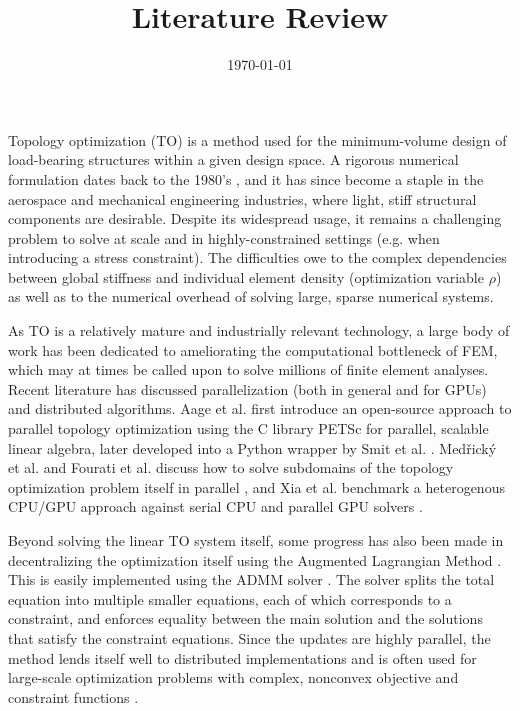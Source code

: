 \documentclass[12pt]{article}
\title{Literature Review}
\author{}
\date{\today}
\begin{document}
\maketitle

Topology optimization (TO) is a method used for the minimum-volume design of load-bearing structures within a given design space. A rigorous numerical formulation dates back to the 1980's \parencite{bendsoeGeneratingOptimalTopologies1988}, and it has since become a staple in the aerospace and mechanical engineering industries, where light, stiff structural components are desirable. Despite its widespread usage, it remains a challenging problem to solve at scale and in highly-constrained settings (e.g. when introducing a stress constraint). The difficulties owe to the complex dependencies between global stiffness and individual element density (optimization variable $\rho$) as well as to the numerical overhead of solving large, sparse numerical systems.

As TO is a relatively mature and industrially relevant technology, a large body of work has been dedicated to ameliorating the computational bottleneck of FEM, which may at times be called upon to solve millions of finite element analyses. Recent literature has discussed parallelization (both in general and for GPUs) and distributed algorithms. Aage et al. first introduce an open-source approach to parallel topology optimization using the C library PETSc for parallel, scalable linear algebra, later developed into a Python wrapper by Smit et al. \cite{aageTopologyOptimizationUsing2015,smitTopologyOptimizationUsing2021}. Medřický et al. and Fourati et al. discuss how to solve subdomains of the topology optimization problem itself in parallel \parencite{medrickyComparisonFETIbasedDomain2021,fouratiLargescaleSmoothPlastic2021}, and Xia et al. benchmark a heterogenous CPU/GPU approach against serial CPU and parallel GPU solvers \parencite{xiaHybridParallelStrategy2023}. 

Beyond solving the linear TO system itself, some progress has also been made in decentralizing the optimization itself using the Augmented Lagrangian Method \cite{zhaiAlternatingOptimizationDesign2021}. This is easily implemented using the ADMM solver \parencite{boydDistributedOptimizationStatistical2010}. The solver splits the total equation into multiple smaller equations, each of which corresponds to a constraint, and enforces equality between the main solution and the solutions that satisfy the constraint equations. Since the updates are highly parallel, the method lends itself well to distributed implementations and is often used for large-scale optimization problems with complex, nonconvex objective and constraint functions \parencite{moehlePortfolioConstructionLinearly2022}. 
\end{document}
